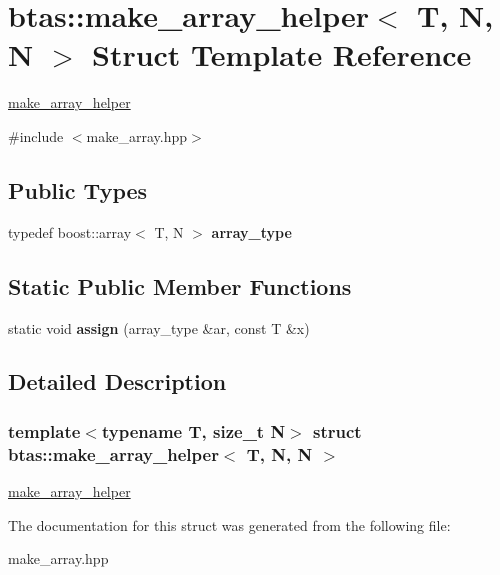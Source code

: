 \hypertarget{structbtas_1_1make__array__helper_3_01_t_00_01_n_00_01_n_01_4}{
\section{btas::make\_\-array\_\-helper$<$ T, N, N $>$ Struct Template Reference}
\label{structbtas_1_1make__array__helper_3_01_t_00_01_n_00_01_n_01_4}
}


\hyperlink{structbtas_1_1make__array__helper}{make\_\-array\_\-helper}  


{\ttfamily \#include $<$make\_\-array.hpp$>$}\subsection*{Public Types}
\begin{DoxyCompactItemize}
\item 
\hypertarget{structbtas_1_1make__array__helper_3_01_t_00_01_n_00_01_n_01_4_ad5cf72bca913fbd0724fb5fc1b1196bd}{
typedef boost::array$<$ T, N $>$ {\bfseries array\_\-type}}
\label{structbtas_1_1make__array__helper_3_01_t_00_01_n_00_01_n_01_4_ad5cf72bca913fbd0724fb5fc1b1196bd}

\end{DoxyCompactItemize}
\subsection*{Static Public Member Functions}
\begin{DoxyCompactItemize}
\item 
\hypertarget{structbtas_1_1make__array__helper_3_01_t_00_01_n_00_01_n_01_4_a0b7e8c95324c90daeb9be5cf5eaecfb2}{
static void {\bfseries assign} (array\_\-type \&ar, const T \&x)}
\label{structbtas_1_1make__array__helper_3_01_t_00_01_n_00_01_n_01_4_a0b7e8c95324c90daeb9be5cf5eaecfb2}

\end{DoxyCompactItemize}


\subsection{Detailed Description}
\subsubsection*{template$<$typename T, size\_\-t N$>$ struct btas::make\_\-array\_\-helper$<$ T, N, N $>$}

\hyperlink{structbtas_1_1make__array__helper}{make\_\-array\_\-helper} 

The documentation for this struct was generated from the following file:\begin{DoxyCompactItemize}
\item 
make\_\-array.hpp\end{DoxyCompactItemize}
